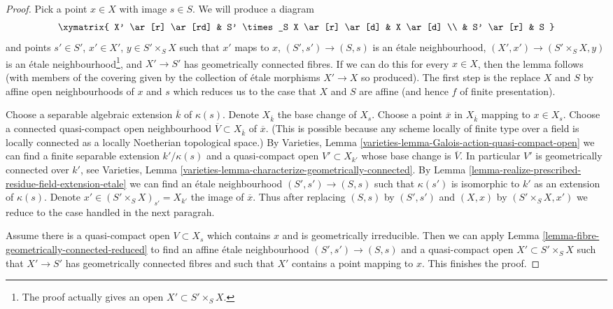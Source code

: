 \begin{proof}
Pick a point $x \in X$ with image $s \in S$. We will produce
a diagram
$$
\xymatrix{
X' \ar[r] \ar[rd] & S' \times_S X \ar[r] \ar[d] & X \ar[d] \\
& S' \ar[r] & S
}
$$
and points $s' \in S'$, $x' \in X'$, $y \in S' \times_S X$
such that $x'$ maps to $x$, $(S', s') \to (S, s)$
is an \'etale neighbourhood, $(X', x') \to (S' \times_S X, y)$
is an \'etale neighbourhood\footnote{The proof actually gives
an open $X' \subset S' \times_S X$.}, and
$X' \to S'$ has geometrically
connected fibres. If we can do this for every $x \in X$, then
the lemma follows (with members of the covering given by the
collection of \'etale morphisms $X' \to X$ so produced).
The first step is the replace $X$ and $S$ by affine open neighbourhoods
of $x$ and $s$ which reduces us to the case that $X$ and $S$ are affine
(and hence $f$ of finite presentation).

\medskip\noindent
Choose a separable algebraic extension $\overline{k}$ of $\kappa(s)$.
Denote $X_{\overline{k}}$ the base change of $X_s$.
Choose a point $\overline{x}$ in $X_{\overline{k}}$ mapping to $x \in X_s$.
Choose a connected quasi-compact open neighbourhood
$\overline{V} \subset X_{\overline{k}}$
of $\overline{x}$. (This is possible because any scheme
locally of finite type over a field is locally connected
as a locally Noetherian topological space.)
By Varieties, Lemma \ref{varieties-lemma-Galois-action-quasi-compact-open}
we can find a finite separable extension $k'/\kappa(s)$
and a quasi-compact open $V' \subset X_{k'}$ whose
base change is $\overline{V}$. In particular $V'$ is
geometrically connected over $k'$, see
Varieties, Lemma \ref{varieties-lemma-characterize-geometrically-connected}. By
Lemma \ref{lemma-realize-prescribed-residue-field-extension-etale}
we can find an \'etale neighbourhood $(S', s') \to (S, s)$
such that $\kappa(s')$ is isomorphic to $k'$ as an extension
of $\kappa(s)$.
Denote $x' \in (S' \times_S X)_{s'} = X_{k'}$ the image of $\overline{x}$.
Thus after replacing $(S, s)$ by $(S', s')$ and $(X, x)$ by
$(S' \times_S X, x')$ we reduce to the case handled in the next
paragrah.

\medskip\noindent
Assume there is a quasi-compact open $V \subset X_s$
which contains $x$ and is geometrically irreducible.
Then we can apply Lemma \ref{lemma-fibre-geometrically-connected-reduced}
to find an affine \'etale neighbourhood $(S', s') \to (S, s)$
and a quasi-compact open $X' \subset S' \times_S X$ such that
$X' \to S'$ has geometrically connected fibres
and such that $X'$ contains a point mapping to $x$.
This finishes the proof.
\end{proof}

